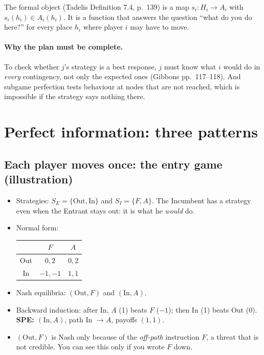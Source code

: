\documentclass[11pt,a4paper]{article}
\begin{document}
\noindent The formal object (Tadelis Definition 7.4, p.~139) is a map
$s_i:H_i\to A_i$ with $s_i(h_i)\in A_i(h_i)$. It is a function that answers the question
``what do you do here?'' for every place $h_i$ where player $i$ may have to move.

\paragraph{Why the plan must be complete.} To check whether $j$'s strategy is a best response,
$j$ must know what $i$ would do in \emph{every} contingency, not only the expected ones (Gibbons
pp.~117--118). And subgame perfection tests behaviour at nodes that are not reached, which is
impossible if the strategy says nothing there.

\section{Perfect information: three patterns}

\subsection{Each player moves once: the entry game (illustration)}

\begin{center}
\end{center}

\begin{itemize}
\item Strategies: $S_E=\{\text{Out},\text{In}\}$ and $S_I=\{F,A\}$. The Incumbent has a strategy
even when the Entrant stays out: it is what he \emph{would} do.
\item Normal form:
\begin{center}\small
\begin{tabular}{c|cc}
 & $F$ & $A$\\\hline
Out & $0,2$ & $0,2$\\
In & $-1,-1$ & $1,1$
\end{tabular}
\end{center}
\item Nash equilibria: $(\text{Out},F)$ and $(\text{In},A)$.
\item Backward induction: after In, $A$ (1) beats $F$ ($-1$); then In (1) beats Out (0).
\textbf{SPE: $(\text{In},A)$}, path In $\to A$, payoffs $(1,1)$.
\item $(\text{Out},F)$ is Nash only because of the \emph{off-path} instruction $F$, a threat that
is not credible. You can see this only if you wrote $F$ down.
\end{itemize}
\end{document}
